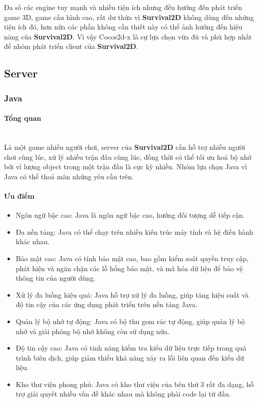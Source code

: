 \documentclass[12pt,a4paper]{article}
\begin{document}
  Đa số các engine tuy mạnh và nhiều tiện ích nhưng đều hướng đến phát triển game 3D, game cấu hình cao, rất dư thừa vì \textbf{Survival2D} không dùng đến những tiện ích đó, hơn nữa các phần không cần thiết này có thể ảnh hưởng đến hiệu năng của \textbf{Survival2D}. Vì vậy Cocos2d-x là sự lựa chọn vừa đủ và phù hợp nhất để nhóm phát triển client của \textbf{Survival2D}.
  
  \subsection{Server}
  \subsubsection{Java}
  \paragraph{Tổng quan}\mbox{}\\
  Là một game nhiều người chơi, server của \textbf{Survival2D} cần hỗ trợ nhiều người chơi cùng lúc, xử lý nhiều trận đấu cùng lúc, đồng thời có thể tối ưu hoá bộ nhớ bởi vì lượng object trong một trận đấu là cực kỳ nhiều. Nhóm lựa chọn Java vì Java có thể thoả mãn những yêu cầu trên.

  \paragraph{Ưu điểm}
  \begin{itemize}
    \item Ngôn ngữ bậc cao: Java là ngôn ngữ bậc cao, hướng đối tượng dễ tiếp cận.
    \item Đa nền tảng: Java có thể chạy trên nhiều kiến trúc máy tính và hệ điều hành khác nhau.
    \item Bảo mật cao: Java có tính bảo mật cao, bao gồm kiểm soát quyền truy cập, phát hiện và ngăn chặn các lỗ hổng bảo mật, và mã hóa dữ liệu để bảo vệ thông tin của người dùng.
    \item Xử lý đa luồng hiệu quả: Java hỗ trợ xử lý đa luồng, giúp tăng hiệu suất và độ tin cậy của các ứng dụng phát triển trên nền tảng Java.
    \item Quản lý bộ nhớ tự động: Java có bộ thu gom rác tự động, giúp quản lý bộ nhớ và giải phóng bộ nhớ không còn sử dụng nữa.
    \item Độ tin cậy cao: Java có tính năng kiểm tra kiểu dữ liệu trực tiếp trong quá trình biên dịch, giúp giảm thiểu khả năng xảy ra lỗi liên quan đến kiểu dữ liệu.
    \item Kho thư viện phong phú: Java có kho thư viện của bên thứ 3 rất đa dạng, hỗ trợ giải quyết nhiều vấn đề khác nhau mà không phải code lại từ đầu.
  \end{itemize}
\end{document}
